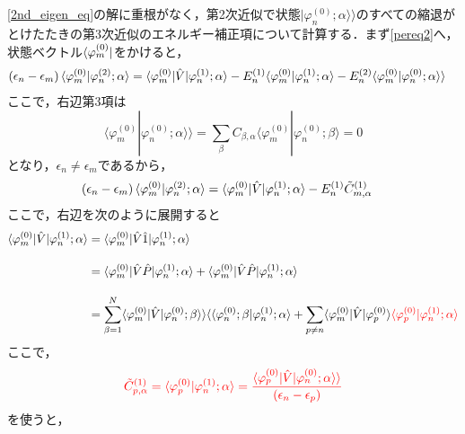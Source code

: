 \subsection{}
\eqref{2nd_eigen_eq}の解に重根がなく，第2次近似で状態$|\varphi^{(0)}_n;\alpha\rangle\rangle$のすべての縮退がとけたたきの第3次近似のエネルギー補正項について計算する．まず\eqref{pereq2}へ，状態ベクトル$\bra{\varphi^{(0)}_{m}}$をかけると，
\begin{align}
    (\epsilon_n-\epsilon_m)\braket{\varphi^{(0)}_{m}|\varphi^{(2)}_n;\alpha}
    &=\braket{\varphi^{(0)}_{m}|\hat{V}|\varphi^{(1)}_n;\alpha}
    -E^{(1)}_n\langle\varphi^{(0)}_{m}|\varphi^{(1)}_n;\alpha\rangle
    -E^{(2)}_n\langle\varphi^{(0)}_{m}|\varphi^{(0)}_n;\alpha\rangle\rangle
\end{align}
ここで，右辺第3項は
\begin{equation}
    \langle\varphi^{(0)}_{m}|\varphi^{(0)}_n;\alpha\rangle\rangle
    = \sum_{\beta}C_{\beta,\alpha}\langle\varphi^{(0)}_{m}|\varphi^{(0)}_n;\beta\rangle
    =0
\end{equation}
となり，$\epsilon_n\neq\epsilon_m$であるから，
\begin{align}
    (\epsilon_n-\epsilon_m)\braket{\varphi^{(0)}_{m}|\varphi^{(2)}_n;\alpha}
    &=\braket{\varphi^{(0)}_{m}|\hat{V}|\varphi^{(1)}_n;\alpha}
    -E^{(1)}_n\Tilde{C}^{(1)}_{m,\alpha}
\end{align}
ここで，右辺を次のように展開すると
\begin{align}
    \braket{\varphi^{(0)}_{m}|\hat{V}|\varphi^{(1)}_n;\alpha}
    &=\braket{\varphi^{(0)}_{m}|\hat{V}\hat{1}|\varphi^{(1)}_n;\alpha}\nn[10pt]
    &=\braket{\varphi^{(0)}_{m}|\hat{V}\hat{P}|\varphi^{(1)}_n;\alpha}
    +\braket{\varphi^{(0)}_{m}|\hat{V}\hat{P}|\varphi^{(1)}_n;\alpha}\nn[10pt]
    &=\sum_{\beta=1}^N\langle{\varphi^{(0)}_{m}|\hat{V}|\varphi^{(0)}_n;\beta}\rangle\rangle
    \langle\langle{\varphi^{(0)}_n;\beta|\varphi^{(1)}_n;\alpha}\rangle
    +\sum_{p\neq n}\langle{\varphi^{(0)}_{m}|\hat{V}|\varphi^{(0)}_p}\rangle
    \textcolor{red}{\langle{\varphi^{(0)}_p|\varphi^{(1)}_n;\alpha}\rangle}
\end{align}
ここで，
\begin{align}
    \textcolor{red}{\Tilde{C}^{(1)}_{p,\alpha}=\langle{\varphi^{(0)}_p|\varphi^{(1)}_n;\alpha}\rangle
    =\frac{\braket{\varphi^{(0)}_{p}|\hat{V}|\varphi^{(0)}_n;\alpha}\rangle}{(\epsilon_n-\epsilon_p)}
    }
\end{align}
を使うと，

